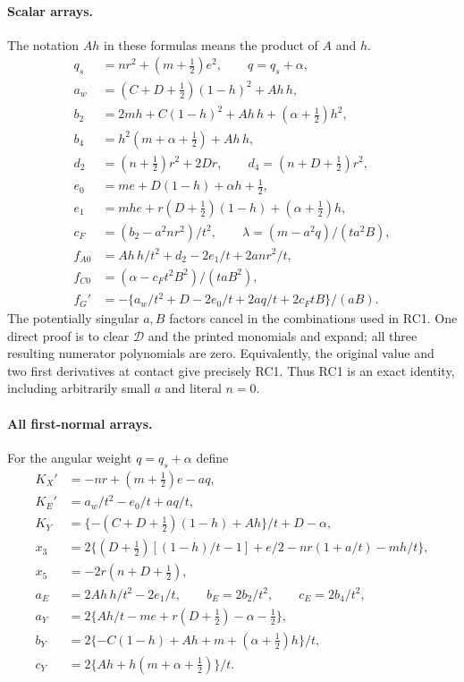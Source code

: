 \paragraph{Scalar arrays.}
The notation $Ah$ in these formulas means the product of $A$ and $h$.
\[
\begin{aligned}
q_s&=nr^2+(m+\tfrac12)e^2,\qquad q=q_s+\alpha,\\
a_w&=(C+D+\tfrac12)(1-h)^2+Ah\,h,\\
b_2&=2mh+C(1-h)^2+Ah\,h+(\alpha+\tfrac12)h^2,\\
b_4&=h^2(m+\alpha+\tfrac12)+Ah\,h,\\
d_2&=(n+\tfrac12)r^2+2Dr,\qquad
d_4=(n+D+\tfrac12)r^2,\\
e_0&=me+D(1-h)+\alpha h+\tfrac12,\\
e_1&=mhe+r(D+\tfrac12)(1-h)+(\alpha+\tfrac12)h,\\
c_F&=(b_2-a^2nr^2)/t^2,\qquad
\lambda=(m-a^2q)/(ta^2B),\\
f_{A0}&=Ah\,h/t^2+d_2-2e_1/t+2anr^2/t,\\
f_{C0}&=(\alpha-c_Ft^2B^2)/(taB^2),\\
f_G'&=-\{a_w/t^2+D-2e_0/t+2aq/t+2c_FtB\}/(aB).
\end{aligned}
\]
The potentially singular $a,B$ factors cancel in the combinations
used in RC1. One direct proof is to clear $\mathcal D$ and the printed
monomials and expand; all three resulting numerator polynomials are
zero. Equivalently, the original value and two first derivatives at
contact give precisely RC1. Thus RC1 is an exact identity, including
arbitrarily small $a$ and literal $n=0$.

\paragraph{All first-normal arrays.}
For the angular weight $q=q_s+\alpha$ define
\[
\begin{aligned}
K_X'&=-nr+(m+\tfrac12)e-aq,\\
K_E'&=a_w/t^2-e_0/t+aq/t,\\
K_Y&=\{-(C+D+\tfrac12)(1-h)+Ah\}/t+D-\alpha,\\
x_3&=2\{(D+\tfrac12)[(1-h)/t-1]+e/2-nr(1+a/t)-mh/t\},\\
x_5&=-2r(n+D+\tfrac12),\\
a_E&=2Ah\,h/t^2-2e_1/t,\qquad b_E=2b_2/t^2,\qquad c_E=2b_4/t^2,\\
a_Y&=2\{Ah/t-me+r(D+\tfrac12)-\alpha-\tfrac12\},\\
b_Y&=2\{-C(1-h)+Ah+m+(\alpha+\tfrac12)h\}/t,\\
c_Y&=2\{Ah+h(m+\alpha+\tfrac12)\}/t.
\end{aligned}
\]

